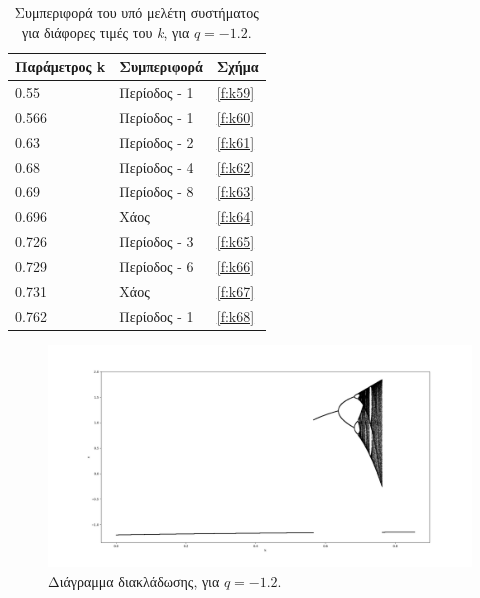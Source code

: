 \begin{table}[ht]
	\centering
	\caption{ Συμπεριφορά του υπό μελέτη συστήματος για διάφορες τιμές του \emph{k}, για $q=-1.2$.}
	\label{tab:abc5}
	\begin{tabular}{l | l | l}
		Παράμετρος k & Συμπεριφορά & Σχήμα\\
		\hline
		0.55 &  Περίοδος -  1 & \ref{f:k59}\\
		0.566 &  Περίοδος -  1 & \ref{f:k60}\\
		0.63& Περίοδος -  2 & \ref{f:k61}\\
		0.68& Περίοδος -  4 & \ref{f:k62}\\
		0.69 &  Περίοδος -  8 & \ref{f:k63}\\
		0.696& Χάος & \ref{f:k64}\\
		0.726& Περίοδος -  3 & \ref{f:k65}\\
		0.729& Περίοδος -  6 & \ref{f:k66}\\
		0.731& Χάος & \ref{f:k67}\\
		0.762 &  Περίοδος -  1 & \ref{f:k68}\\
	\end{tabular}
\end{table}

\begin{figure}[ht]
	\centering
	\includegraphics[width=1\linewidth]{LateX images/graphs q12/g1}
	\caption{ Διάγραμμα διακλάδωσης, για $q=-1.2$.}
	\label{f:g16}
\end{figure}


